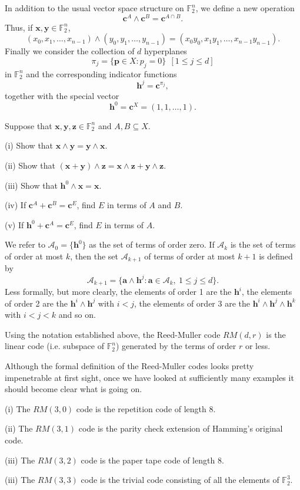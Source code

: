 In addition to
the usual vector space structure on ${\mathbb F}_{2}^{n}$,
we define a new operation
\[{\mathbf c}^{A}\wedge{\mathbf c}^{B}
={\mathbf c}^{A\cap B}.\]
Thus, if ${\mathbf x},{\mathbf y}\in {\mathbb F}_{2}^{n}$,
\[(x_{0},x_{1},\dots,x_{n-1})\wedge(y_{0},y_{1},\dots,y_{n-1})
=(x_{0}y_{0},x_{1}y_{1},\dots,x_{n-1}y_{n-1}).\]
Finally we consider the collection of $d$ hyperplanes
\[\pi_{j}=\{{\mathbf p}\in X:p_{j}=0\}\ \  [1\leq j\leq d]\]
in ${\mathbb F}_{2}^{n}$
and the corresponding indicator functions
\[{\mathbf h}^{j}={\mathbf c}^{\pi_{j}},\]
together with the special vector
\[{\mathbf h}^{0}={\mathbf c}^{X}=(1,1,\dots,1).\]
\begin{exercise} Suppose that
${\mathbf x},{\mathbf y},{\mathbf z}\in {\mathbb F}_{2}^{n}$
and $A,B\subseteq X$.

(i) Show that
${\mathbf x}\wedge{\mathbf y}={\mathbf y}\wedge{\mathbf x}$.

(ii) Show that
$({\mathbf x}+{\mathbf y})\wedge{\mathbf z}
={\mathbf x}\wedge{\mathbf z}+{\mathbf y}\wedge{\mathbf z}$.

(iii) Show that ${\mathbf h}^{0}\wedge{\mathbf x}={\mathbf x}$.

(iv) If ${\mathbf c}^{A}+{\mathbf c}^{B}={\mathbf c}^{E}$,
find $E$ in terms of $A$ and $B$.

(v) If ${\mathbf h}^{0}+{\mathbf c}^{A}={\mathbf c}^{E}$,
find $E$ in terms of $A$.
\end{exercise}

We refer to ${\mathcal A}_{0}=\{{\mathbf h}^{0}\}$ as the
set of terms of order zero.
If ${\mathcal A}_{k}$ is the set of terms of order at most $k$,
then the set ${\mathcal A}_{k+1}$ of terms of order at most $k+1$
is defined by
\[{\mathcal A}_{k+1}=\{{\mathbf a}\wedge{\mathbf h}^{j}:
{\mathbf a}\in {\mathcal A}_{k},\ 1\leq j\leq d\}.\]
Less formally, but more clearly, the elements
of order 1 are the ${\mathbf h}^{i}$, the elements
of order 2 are the ${\mathbf h}^{i}\wedge{\mathbf h}^{j} $
with $i<j$, the elements
of order 3 are the
${\mathbf h}^{i}\wedge{\mathbf h}^{j}\wedge{\mathbf h}^{k}$
with $i<j<k$ and so on.
\begin{definition} Using the notation established
above, the Reed-Muller code  $RM(d,r)$ is the linear code
(i.e. subspace of ${\mathbb F}_{2}^{n}$) generated
by the terms of order $r$ or less.
\end{definition}

Although the formal definition of the Reed-Muller codes
looks pretty impenetrable at first sight, once
we have looked at sufficiently many examples
it should become clear what is going on.
\begin{example}
(i) The $RM(3,0)$ code is the repetition
code of length $8$.

(ii) The $RM(3,1)$ code is the parity check
extension of Hamming's original code.

(iii) The $RM(3,2)$ code is the paper tape code
of length $8$.

(iii) The $RM(3,3)$ code is the trivial code
consisting of all the elements of
${\mathbb F}^{3}_{2}$.
\end{example}

